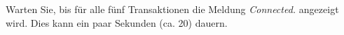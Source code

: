         \item Warten Sie, bis f\"ur alle f\"unf Transaktionen die Meldung \textit{Connected.} angezeigt wird. Dies kann ein paar Sekunden (ca. 20) dauern.
